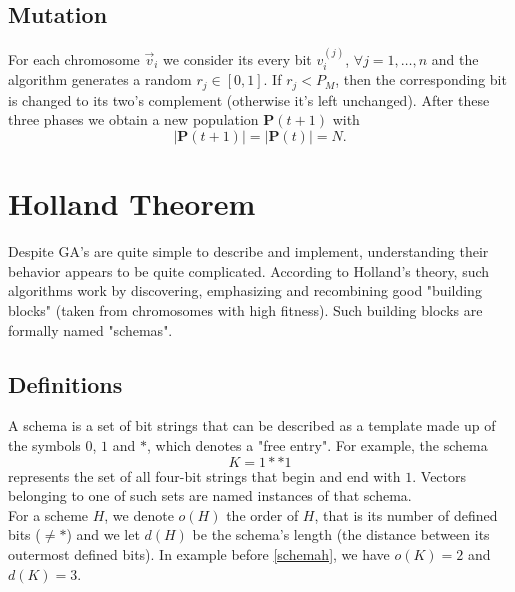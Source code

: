 \documentclass[%
    corpo=11pt,
    twoside,
    stile=classica,
    oldstyle,
    autoretitolo,
    tipotesi=magistrale,
    greek,
    evenboxes,
    english
]{toptesi}
\begin{document}
\subsection{Mutation}
For each chromosome $\vec{v}_i$ we consider its every bit $v_i^{(j)}$, $\forall j=1,\dots,n$ and the algorithm generates a random $r_j \in \left[0,1\right]$.
If $r_j < P_M$, then the corresponding bit is changed to its two's complement (otherwise it's left unchanged). After these three phases we obtain a new population $\textbf{P}(t+1)$ with 
\begin{equation}
|\textbf{P}(t+1)|=|\textbf{P}(t)|=N.
\end{equation}

\section{Holland Theorem}
Despite GA's are quite simple to describe and implement, understanding their behavior appears to be quite complicated. According to Holland's theory, such algorithms work by discovering, emphasizing and recombining good "building blocks" (taken from chromosomes with high fitness). Such building blocks are formally named "schemas". 
\subsection{Definitions}
A schema is a set of bit strings that can be described as a template made up of the symbols $0$, $1$ and $*$, which denotes a "free entry". For example, the schema
\begin{equation}
\label{schemah}
K = 1**1
\end{equation}
represents the set of all four-bit strings that begin and end with $1$. Vectors belonging to one of such sets are named instances of that schema. \\
For a scheme $H$, we denote $o(H)$ the order of $H$, that is its number of defined bits ($\neq *$) and we let $d(H)$ be the schema's length (the distance between its outermost defined bits). In example before \eqref{schemah}, we have $o(K)=2$ and $d(K)=3$.
\end{document}
